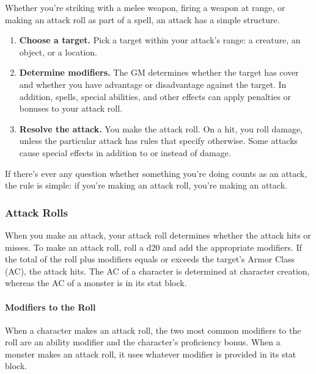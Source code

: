 \documentclass[
]{article}
\providecommand{\tightlist}{%
  \setlength{\itemsep}{0pt}\setlength{\parskip}{0pt}}
\begin{document}
Whether you're striking with a melee weapon, firing a weapon at range,
or making an attack roll as part of a spell, an attack has a simple
structure.

\begin{enumerate}
\def\labelenumi{\arabic{enumi}.}
\tightlist
\item
  \textbf{Choose a target.} Pick a target within your attack's range: a
  creature, an object, or a location.
\item
  \textbf{Determine modifiers.} The GM determines whether the target has
  cover and whether you have advantage or disadvantage against the
  target. In addition, spells, special abilities, and other effects can
  apply penalties or bonuses to your attack roll.
\item
  \textbf{Resolve the attack.} You make the attack roll. On a hit, you
  roll damage, unless the particular attack has rules that specify
  otherwise. Some attacks cause special effects in addition to or
  instead of damage.
\end{enumerate}

If there's ever any question whether something you're doing counts as an
attack, the rule is simple: if you're making an attack roll, you're
making an attack.

\hypertarget{attack-rolls}{%
\subsubsection{Attack Rolls}\label{attack-rolls}}

When you make an attack, your attack roll determines whether the attack
hits or misses. To make an attack roll, roll a d20 and add the
appropriate modifiers. If the total of the roll plus modifiers equals or
exceeds the target's Armor Class (AC), the attack hits. The AC of a
character is determined at character creation, whereas the AC of a
monster is in its stat block.

\hypertarget{modifiers-to-the-roll}{%
\paragraph{Modifiers to the Roll}\label{modifiers-to-the-roll}}

When a character makes an attack roll, the two most common modifiers to
the roll are an ability modifier and the character's proficiency bonus.
When a monster makes an attack roll, it uses whatever modifier is
provided in its stat block.
\end{document}
